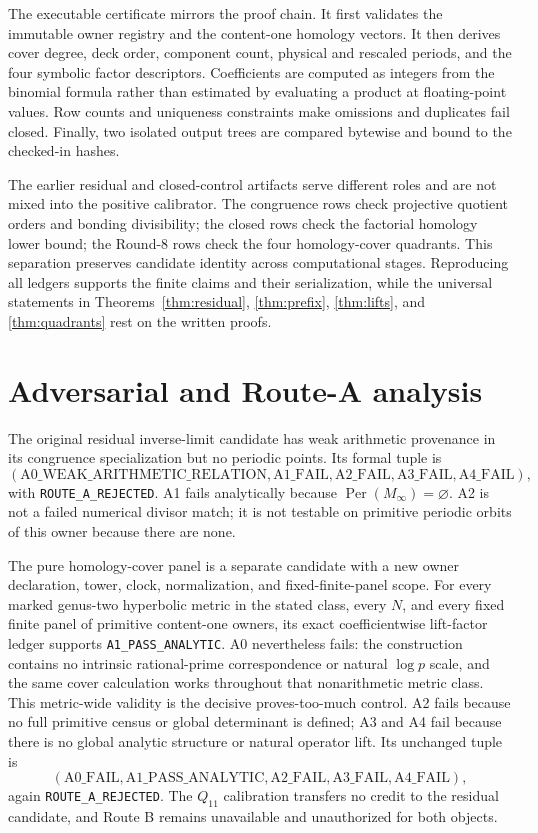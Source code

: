 \documentclass[11pt]{article}
\theoremstyle{definition}
\theoremstyle{remark}
\newcommand{\Per}{\operatorname{Per}}
\begin{document}
The executable certificate mirrors the proof chain. It first validates the immutable owner registry and the content-one homology vectors. It then derives cover degree, deck order, component count, physical and rescaled periods, and the four symbolic factor descriptors. Coefficients are computed as integers from the binomial formula rather than estimated by evaluating a product at floating-point values. Row counts and uniqueness constraints make omissions and duplicates fail closed. Finally, two isolated output trees are compared bytewise and bound to the checked-in hashes.

The earlier residual and closed-control artifacts serve different roles and are not mixed into the positive calibrator. The congruence rows check projective quotient orders and bonding divisibility; the closed rows check the factorial homology lower bound; the Round-8 rows check the four homology-cover quadrants. This separation preserves candidate identity across computational stages. Reproducing all ledgers supports the finite claims and their serialization, while the universal statements in Theorems~\ref{thm:residual}, \ref{thm:prefix}, \ref{thm:lifts}, and \ref{thm:quadrants} rest on the written proofs.

\section{Adversarial and Route-A analysis}

The original residual inverse-limit candidate has weak arithmetic provenance in its congruence specialization but no periodic points. Its formal tuple is
\[
(\mathrm{A0\_WEAK\_ARITHMETIC\_RELATION},
\mathrm{A1\_FAIL},\mathrm{A2\_FAIL},\mathrm{A3\_FAIL},\mathrm{A4\_FAIL}),
\]
with \texttt{ROUTE\_A\_REJECTED}. A1 fails analytically because $\Per(M_\infty)=\varnothing$. A2 is not a failed numerical divisor match; it is not testable on primitive periodic orbits of this owner because there are none.

The pure homology-cover panel is a separate candidate with a new owner declaration, tower, clock, normalization, and fixed-finite-panel scope. For every marked genus-two hyperbolic metric in the stated class, every $N$, and every fixed finite panel of primitive content-one owners, its exact coefficientwise lift-factor ledger supports \texttt{A1\_PASS\_ANALYTIC}. A0 nevertheless fails: the construction contains no intrinsic rational-prime correspondence or natural $\log p$ scale, and the same cover calculation works throughout that nonarithmetic metric class. This metric-wide validity is the decisive proves-too-much control. A2 fails because no full primitive census or global determinant is defined; A3 and A4 fail because there is no global analytic structure or natural operator lift. Its unchanged tuple is
\[
(\mathrm{A0\_FAIL},\mathrm{A1\_PASS\_ANALYTIC},
\mathrm{A2\_FAIL},\mathrm{A3\_FAIL},\mathrm{A4\_FAIL}),
\]
again \texttt{ROUTE\_A\_REJECTED}. The $Q_{11}$ calibration transfers no credit to the residual candidate, and Route B remains unavailable and unauthorized for both objects.
\end{document}
